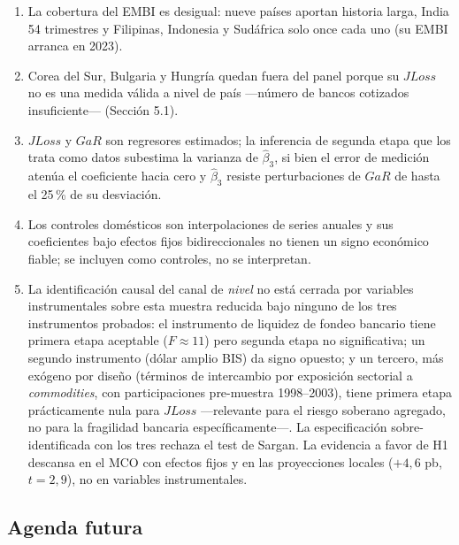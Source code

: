 \begin{enumerate}
\item La cobertura del EMBI es desigual: nueve países aportan historia larga, India 54 trimestres y Filipinas, Indonesia y Sudáfrica solo once cada uno (su EMBI arranca en 2023).

\item Corea del Sur, Bulgaria y Hungría quedan fuera del panel porque su $JLoss$ no es una medida válida a nivel de país —número de bancos cotizados insuficiente— (Sección 5.1).

\item $JLoss$ y $GaR$ son regresores estimados; la inferencia de segunda etapa que los trata como datos subestima la varianza de $\hat\beta_3$, si bien el error de medición atenúa el coeficiente hacia cero y $\hat\beta_3$ resiste perturbaciones de $GaR$ de hasta el 25\,\% de su desviación.

\item Los controles domésticos son interpolaciones de series anuales y sus coeficientes bajo efectos fijos bidireccionales no tienen un signo económico fiable; se incluyen como controles, no se interpretan.

\item La identificación causal del canal de \emph{nivel} no está cerrada por variables instrumentales sobre esta muestra reducida bajo ninguno de los tres instrumentos probados: el instrumento de liquidez de fondeo bancario tiene primera etapa aceptable ($F\approx11$) pero segunda etapa no significativa; un segundo instrumento (dólar amplio BIS) da signo opuesto; y un tercero, más exógeno por diseño (términos de intercambio por exposición sectorial a \textit{commodities}, con participaciones pre-muestra 1998--2003), tiene primera etapa prácticamente nula para $JLoss$ —relevante para el riesgo soberano agregado, no para la fragilidad bancaria específicamente—. La especificación sobre-identificada con los tres rechaza el test de Sargan. La evidencia a favor de H1 descansa en el MCO con efectos fijos y en las proyecciones locales ($+4{,}6$ pb, $t=2{,}9$), no en variables instrumentales.
\end{enumerate}

\subsection{Agenda futura}
\label{sec:agenda-futura}

